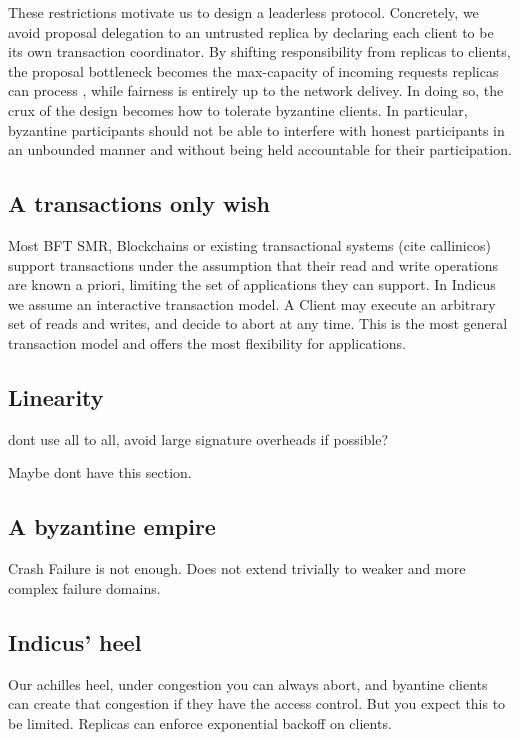 These restrictions motivate us to design a leaderless protocol. Concretely, we avoid proposal delegation to an untrusted replica by declaring each client to be its own transaction coordinator.
By shifting responsibility from replicas to clients, the proposal bottleneck becomes the max-capacity of incoming requests replicas can process , while fairness is entirely up to the network delivey. In doing so, the crux of the design becomes how to tolerate byzantine clients. In particular, byzantine participants should not be able to interfere with honest participants in an unbounded manner and without being held accountable for their participation. 

\subsection{A transactions only wish}
Most BFT SMR, Blockchains or existing transactional systems (cite callinicos) support transactions under the assumption that their read and write operations are known a priori, limiting the set of applications they can support. In Indicus we assume an interactive transaction model. A Client may execute an arbitrary set of reads and writes, and decide to abort at any time. This is the most general transaction model and offers the most flexibility for applications.



\subsection{Linearity}
dont use all to all, avoid large signature overheads if possible?

Maybe dont have this section. 

\subsection{A byzantine empire}
Crash Failure is not enough. Does not extend trivially to weaker and more complex failure domains.

\subsection{Indicus' heel}
Our achilles heel, under congestion you can always abort, and byantine clients can create that congestion if they have the access control. But you expect this to be limited. 
Replicas can enforce exponential backoff on clients.